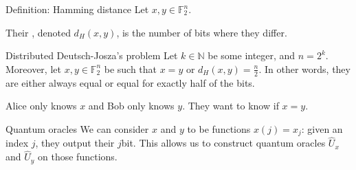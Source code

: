 \documentclass[a4paper]{article}
\begin{document}
\begin{parag}{Definition: Hamming distance}
    Let $x, y \in \mathbb{F}_2^n$.

    Their , denoted $d_H\left(x, y\right)$, is the number of bits where they differ. 
\end{parag}

\begin{parag}{Distributed Deutsch-Josza's problem}
    Let $k \in \mathbb{N}$ be some integer, and $n = 2^k$. Moreover, let $x, y \in \mathbb{F}_2^n$ be such that $x = y$ or $d_H\left(x, y\right) = \frac{n}{2}$. In other words, they are either always equal or equal for exactly half of the bits.

    Alice only knows $x$ and Bob only knows $y$. They want to know if $x = y$.

    \begin{subparag}{Quantum oracles}
        We can consider $x$ and $y$ to be functions $x\left(j\right) = x_j$: given an index $j$, they output their $j$\Th bit. This allows us to construct quantum oracles $\hat{U}_x$ and $\hat{U}_y$ on those functions.
    \end{subparag}
\end{parag}
\end{document}
